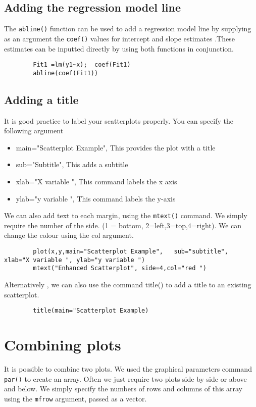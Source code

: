 \documentclass[a4paper,12pt]{article}
\begin{document}
\begin{itemize}
		\subsection{Adding the regression model line}
		
		The \texttt{abline()} function can be used to add a regression model line  by supplying as an argument the \texttt{coef()} values for intercept and slope estimates .These estimates can be inputted directly by using both functions in conjunction.
		
		\large \begin{verbatim}
		Fit1 =lm(y1~x);  coef(Fit1)
		abline(coef(Fit1))	
		\end{verbatim}\large
		
		\subsection{Adding a title }
		
		It is good practice to label your scatterplots properly. You can specify the following argument
		\begin{itemize}
			\item	main="Scatterplot Example", 	This provides the plot with a title
			\item	sub="Subtitle",                 This adds a subtitle
			\item	xlab="X variable ",				This command labels the x axis 
			\item   ylab="y variable ",				This command labels the y-axis
		\end{itemize}
		We can also add text to each margin, using the \texttt{mtext()} command.  
		We simply require the number of the side. (1 = bottom, 2=left,3=top,4=right). 
		We can change the colour using the col argument.
		\large \begin{verbatim}
		plot(x,y,main="Scatterplot Example",   sub="subtitle",    xlab="X variable ", ylab="y variable ")	
		mtext("Enhanced Scatterplot", side=4,col="red ")
		\end{verbatim}\large
		Alternatively , we can also use the command title() to add a title to an existing scatterplot.
		\large \begin{verbatim}
		title(main="Scatterplot Example)	
		\end{verbatim}\large
		
		
		\section{Combining plots}
		It is possible to combine two plots. We used the graphical parameters command \texttt{par()} to create an array. 
		Often we just require two plots side by side or above and below. We simply specify the numbers of rows and columns of this array using the \texttt{mfrow} argument, passed as a vector.
		

\end{itemize}
\end{document}
